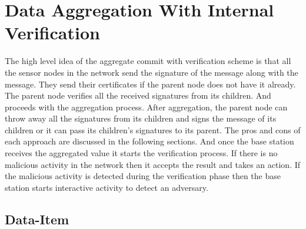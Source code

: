 \chapter{Data Aggregation With Internal Verification} %
\label{cha:Data Aggregation With Internal Verification}

	The high level idea of the aggregate commit with verification scheme is that all the sensor nodes in the network send the signature of the message along with the message.
	They send their certificates if the parent node does not have it already.
	The parent node verifies all the received signatures from its children.
	And proceeds with the aggregation process.
	After aggregation, the parent node can throw away all the signatures from its children and signs the message of its children or it can pass its children's signatures to its parent. 
	The pros and cons of each approach are discussed in the following sections. 
	And once the base station receives the aggregated value it starts the verification process. 
	If there is no malicious activity in the network then  it accepts the result and takes an action.
	If the malicious activity is detected during the verification phase then the base station starts interactive activity to detect an adversary. 

\section{Data-Item}
	
